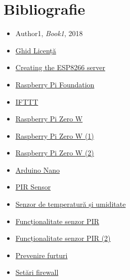 \chapter*{Bibliografie} 

\begin{itemize}
    \item Author1, \textit{Book1}, 2018
    \item \href{https://profs.info.uaic.ro/~licenta/2019Feb/res/Ghid-LICENTA-2018.pdf}{Ghid Licență}
	\item \href{https://tttapa.github.io/ESP8266/Chap10%20-%20Simple%20Web%20Server.html}{Creating the ESP8266 server}
	\item \href{https://www.raspberrypi.org/}{Raspberry Pi Foundation}
	\item \href{https://www.pcmag.com/reviews/ifttt}{IFTTT}
	\item \href{https://www.pcmag.com/reviews/raspberry-pi-zero-w}{Raspberry Pi Zero W}
	\item \href{https://www.trustedreviews.com/reviews/1-raspberry-pi-zero-w}{Raspberry Pi Zero W (1)}
	\item \href{https://itsfoss.com/raspberry-pi-zero-w/}{Raspberry Pi Zero W (2)}
	\item \href{https://www.makeuseof.com/tag/cheapest-arduino-nano/}{Arduino Nano}
	\item \href{https://www.elektor.com/hc-sr501-pir-motion-sensor-module}{PIR Sensor}
	\item \href{https://www.optimusdigital.ro/ro/senzori-senzori-de-temperatura/1449-modul-senzor-de-temperatura-i-umiditate-dht22.html?search_query=temperatura&results=1060}{Senzor de temperatură și umiditate}
	\item \href{https://lumoscontrols.com/resources/microwave-vs-pir-motion-sensors/}{Funcționalitate senzor PIR}
	\item \href{https://www.tutorialspoint.com/arduino/arduino_pir_sensor.htm}{Funcționalitate senzor PIR (2)}
	\item \href{https://www.politiaromana.ro/ro/prevenire/furturi-din-locuinte}{Prevenire furturi}
	\item \href{https://pimylifeup.com/raspberry-pi-ufw/}{Setări firewall}
\end{itemize}